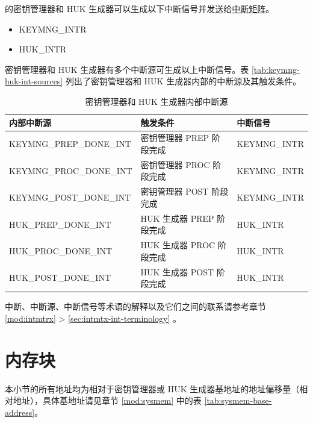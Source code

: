 \documentclass[main\_\_CN.tex]{subfiles}
\begin{document}
\chipname{} 的密钥管理器和 HUK 生成器可以生成以下中断信号并发送给\hyperref[mod:intmtrx]{中断矩阵}。

    \begin{itemize}
        \item KEYMNG\_INTR
        \item HUK\_INTR
    \end{itemize}

密钥管理器和 HUK 生成器有多个中断源可生成以上中断信号。表  \ref{tab:keymng-huk-int-sources} 列出了密钥管理器和 HUK 生成器内部的中断源及其触发条件。

\begin{longtable}{ | L{4.5cm} | L{8cm} | L{3cm} | }
\caption{密钥管理器和 HUK 生成器内部中断源} \label{tab:keymng-huk-int-sources}
\\ \hline
{}
\textbf{内部中断源} & \textbf{触发条件}  &  \textbf{中断信号}\\ \hline
\label{int:KEYMNGPREPDONEINT}KEYMNG\_PREP\_DONE\_INT  & 密钥管理器 PREP 阶段完成  &  KEYMNG\_INTR  \\ \hline
\label{int:KEYMNGPROCDONEINT}KEYMNG\_PROC\_DONE\_INT  &  密钥管理器 PROC 阶段完成 &  KEYMNG\_INTR  \\ \hline
\label{int:KEYMNGPOSTDONEINT}KEYMNG\_POST\_DONE\_INT  &  密钥管理器 POST 阶段完成 &  KEYMNG\_INTR  \\ \hline
\label{int:HUKPREPDONEINT}HUK\_PREP\_DONE\_INT  &  HUK 生成器 PREP 阶段完成 &  HUK\_INTR  \\ \hline
\label{int:HUKPROCDONEINT}HUK\_PROC\_DONE\_INT  & HUK 生成器 PROC 阶段完成 &  HUK\_INTR  \\ \hline
\label{int:HUKPOSTDONEINT}HUK\_POST\_DONE\_INT  & HUK 生成器 POST 阶段完成 &  HUK\_INTR  \\ \hline
\end{longtable}

\begin{tiplisting}
中断、中断源、中断信号等术语的解释以及它们之间的联系请参考章节 \ref{mod:intmtrx} \textit{} > \ref{sec:intmtx-int-terminology} \textit{}。
\end{tiplisting}

\section{内存块}

本小节的所有地址均为相对于密钥管理器或 HUK 生成器基地址的地址偏移量（相对地址），具体基地址请见章节  \ref{mod:sysmem} \textit{} 中的表  \ref{tab:sysmem-base-address}。
\end{document}
